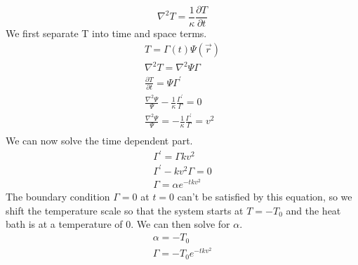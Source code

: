 \documentclass[a4paper,10pt]{article}
\numberwithin{equation}{section}
\begin{document}
\begin{equation}
 \nabla^2T=\frac{1}{\kappa}\frac{\partial T}{\partial t}
\end{equation}
We first separate T into time and space terms.
\begin{gather}
 T=\Gamma (t)\Psi(\vec{r})\\
 \nabla ^2T=\nabla ^2 \Psi \Gamma\\
 \frac{\partial T}{\partial t}=\Psi \Gamma ^{\prime}\\
 \frac{\nabla ^2 \Psi}{\Psi}-\frac{1}{\kappa}\frac{\Gamma ^{\prime}}{\Gamma}=0\\
 \frac{\nabla ^2 \Psi}{\Psi}=-\frac{1}{\kappa}\frac{\Gamma ^{\prime}}{\Gamma}=v^2\\
\end{gather}
We can now solve the time dependent part.
\begin{gather}
\Gamma ^{\prime}=\Gamma kv^2\\
\Gamma ^{\prime}-kv^2\Gamma=0\\
\Gamma=\alpha e^{-tkv^2}
\end{gather}
The boundary condition $\Gamma=0$ at $t=0$ can't be satisfied by this equation, so we shift the temperature scale so that the system
starts at $T=-T_0$ and the heat bath is at a temperature of 0. We can then solve for $\alpha$.
\begin{gather}
\alpha = -T_0\\
\Gamma=-T_0 e^{-tkv^2}
\end{gather}
\end{document}
